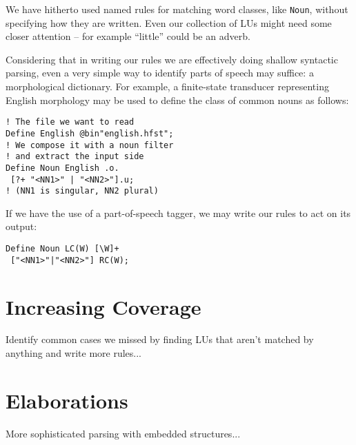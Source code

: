 \documentclass[11pt]{article}
\begin{document}
We have hitherto used named rules for matching word classes, like \verb+Noun+,
without specifying how they are written. Even our collection of LUs might need
some closer attention -- for example ``little'' could be an adverb.

Considering that in writing our
rules we are effectively doing shallow syntactic parsing, even a very simple
way to identify parts of speech may suffice: a morphological dictionary.
For example, a finite-state transducer representing English morphology may be
used to define the class of common nouns as follows:

\begin{verbatim}
! The file we want to read
Define English @bin"english.hfst";
! We compose it with a noun filter
! and extract the input side
Define Noun English .o.
 [?+ "<NN1>" | "<NN2>"].u;
! (NN1 is singular, NN2 plural)
\end{verbatim}

If we have the use of a part-of-speech tagger, we may write our rules to act
on its output:

\begin{verbatim}
Define Noun LC(W) [\W]+
 ["<NN1>"|"<NN2>"] RC(W);
\end{verbatim}

\section{Increasing Coverage}
Identify common cases we missed by finding LUs that aren't matched by
anything and write more rules...

\section{Elaborations}

More sophisticated parsing with embedded structures...



\end{document}
